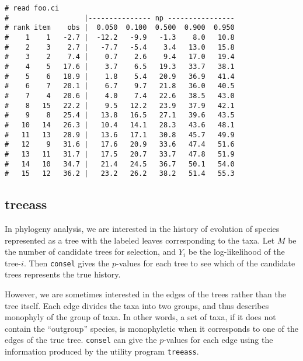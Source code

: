 \documentclass[12pt]{article}
\begin{document}
{\small
\begin{verbatim}
# read foo.ci
#                  |--------------- np ----------------
# rank item    obs |  0.050  0.100  0.500  0.900  0.950
#    1    1   -2.7 |  -12.2   -9.9   -1.3    8.0   10.8
#    2    3    2.7 |   -7.7   -5.4    3.4   13.0   15.8
#    3    2    7.4 |    0.7    2.6    9.4   17.0   19.4
#    4    5   17.6 |    3.7    6.5   19.3   33.7   38.1
#    5    6   18.9 |    1.8    5.4   20.9   36.9   41.4
#    6    7   20.1 |    6.7    9.7   21.8   36.0   40.5
#    7    4   20.6 |    4.0    7.4   22.6   38.5   43.0
#    8   15   22.2 |    9.5   12.2   23.9   37.9   42.1
#    9    8   25.4 |   13.8   16.5   27.1   39.6   43.5
#   10   14   26.3 |   10.4   14.1   28.3   43.6   48.1
#   11   13   28.9 |   13.6   17.1   30.8   45.7   49.9
#   12    9   31.6 |   17.6   20.9   33.6   47.4   51.6
#   13   11   31.7 |   17.5   20.7   33.7   47.8   51.9
#   14   10   34.7 |   21.4   24.5   36.7   50.1   54.0
#   15   12   36.2 |   23.2   26.2   38.2   51.4   55.3
\end{verbatim}
}

\subsection{treeass}

In phylogeny analysis, we are interested in the history of evolution of
species represented as a tree with the labeled leaves corresponding to
the taxa. Let $M$ be the number of candidate trees for selection, and
$Y_i$ be the log-likelihood of the tree-$i$. Then {\tt consel} gives the
$p$-values for each tree to see which of the candidate trees represents
the true history.

However, we are sometimes interested in the edges of the trees rather
than the tree itself. Each edge divides the taxa into two groups, and
thus describes monophyly of the group of taxa. In other words, a set of
taxa, if it does not contain the ``outgroup'' species, is monophyletic
when it corresponds to one of the edges of the true tree. {\tt consel}
can give the $p$-values for each edge using the information produced by
the utility program {\tt treeass}.
\end{document}
